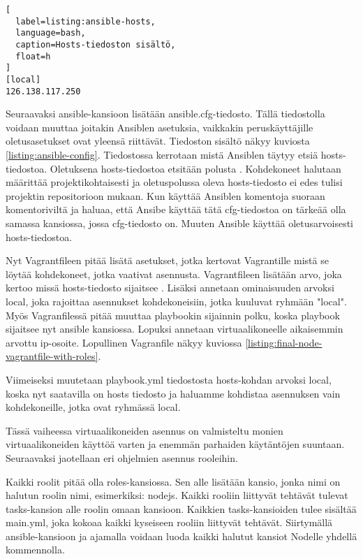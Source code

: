 \begin{lstlisting}[
  label=listing:ansible-hosts,
  language=bash,
  caption=Hosts-tiedoston sisältö,
  float=h
]
[local]
126.138.117.250
\end{lstlisting}

Seuraavaksi ansible-kansioon lisätään ansible.cfg-tiedosto. Tällä tiedostolla voidaan muuttaa joitakin Ansiblen asetuksia, vaikkakin peruskäyttäjille oletusasetukset ovat yleensä riittävät. Tiedoston sisältö näkyy kuviosta \ref{listing:ansible-config}. Tiedostossa kerrotaan mistä Ansiblen täytyy etsiä hosts-tiedostoa. Oletuksena hosts-tiedostoa etsitään polusta  \cite{link:ansible-inventory}. Kohdekoneet halutaan määrittää projektikohtaisesti ja oletuspolussa oleva hosts-tiedosto ei edes tulisi projektin repositorioon mukaan. Kun käyttää Ansiblen komentoja suoraan komentoriviltä ja haluaa, että Ansibe käyttää tätä cfg-tiedostoa on tärkeää olla samassa kansiossa, jossa cfg-tiedosto on. Muuten Ansible käyttää oletusarvoisesti hosts-tiedostoa.

Nyt Vagrantfileen pitää lisätä asetukset, jotka kertovat Vagrantille  mistä se löytää kohdekoneet, jotka vaativat asennusta. Vagrantfileen lisätään  arvo, joka kertoo missä hosts-tiedosto sijaitsee \cite{link:vagrant-ansible-settings}. Lisäksi annetaan  ominaisuuden arvoksi local, joka rajoittaa asennukset kohdekoneisiin, jotka kuuluvat ryhmään "local". Myös Vagranfilessä pitää muuttaa playbookin sijainnin polku, koska playbook sijaitsee nyt ansible kansiossa. Lopuksi annetaan virtuaalikoneelle aikaisemmin arvottu ip-osoite. Lopullinen Vagranfile näkyy kuviossa \ref{listing:final-node-vagrantfile-with-roles}.

Viimeiseksi muutetaan playbook.yml tiedostosta hosts-kohdan arvoksi local, koska nyt saatavilla on hosts tiedosto ja haluamme kohdistaa asennuksen vain kohdekoneille, jotka ovat ryhmässä local.

Tässä vaiheessa virtuaalikoneiden asennus on valmisteltu monien virtuaalikoneiden käyttöä varten ja enemmän parhaiden käytäntöjen suuntaan. Seuraavaksi jaotellaan eri ohjelmien asennus rooleihin.

Kaikki roolit pitää olla roles-kansiossa. Sen alle lisätään kansio, jonka nimi on halutun roolin nimi, esimerkiksi: nodejs. Kaikki rooliin liittyvät tehtävät tulevat tasks-kansion alle roolin omaan kansioon. Kaikkien tasks-kansioiden tulee sisältää main.yml, joka kokoaa kaikki kyseiseen rooliin liittyvät tehtävät. Siirtymällä ansible-kansioon ja ajamalla  voidaan luoda kaikki halutut kansiot Nodelle yhdellä kommennolla.

